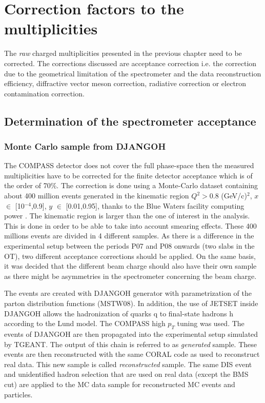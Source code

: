 
\chapter{Correction factors to the multiplicities} %

\label{ch:CF} %


The \textit{raw} charged multiplicities presented in the previous chapter need to be corrected. The corrections discussed are acceptance correction i.e. the correction due to the geometrical limitation of the spectrometer and the data reconstruction efficiency, diffractive vector meson correction, radiative correction or electron contamination correction.

\section{Determination of the spectrometer acceptance} \label{sec:Acc}

\subsection{Monte Carlo sample from DJANGOH}

The COMPASS detector does not cover the full phase-space then the measured multiplicities have
to be corrected for the finite detector acceptance which is of the order of 70\%. The correction is
done using a Monte-Carlo dataset containing about 400 million events generated in the kinematic
region $Q^2 > 0.8$ (GeV/c)$^2$, $x$ $\in$ [10$^{-4}$,0.9], $y$ $\in$ [0.01,0.95], thanks to the Blue Waters facility computing power \cite{BLUEWATERS}. The kinematic region is larger than the one of interest in the analysis. This is done in order to be able to take into account smearing effects. These 400 millions events are divided in 4 different samples. As there is a difference in the experimental setup between the periods P07 and P08 onwards (two slabs in the OT), two different acceptance corrections should be applied. On the same basis, it was decided that the different beam charge should also have their own sample as there might be asymmetries in the spectrometer concerning the beam charge.

The events are created with DJANGOH generator with parametrization of the parton distribution functions (MSTW08). In addition, the use of JETSET inside DJANGOH allows the hadronization of quarks q to final-state hadrons h according to the Lund model. The COMPASS high $p_T$ tuning was used. The events of DJANGOH are then propagated into the experimental setup simulated by TGEANT. The output of this chain is referred to as \textit{generated} sample. These events are then reconstructed with the same CORAL code as used to reconstruct real data. This new sample is called \textit{reconstructed} sample. The same DIS event and unidentified hadron selection that are used on real data (except the BMS cut) are applied to the MC data sample for reconstructed MC events and particles.

